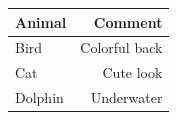 \begin{example}
{\begin{gridlayout}{\textwidth}{11cm}
\begin{row}{0.3}
\begin{cell}{0.3}
\begin{tabular}{lr}
                    \toprule
                    Animal & Comment \\
                    \midrule
                    Bird & Colorful back \\
                    Cat & Cute look \\
                    Dolphin & Underwater \\
                    \bottomrule
                \end{tabular}
            \end{cell}
        \end{row}
    \end{gridlayout}
    }
\end{example}